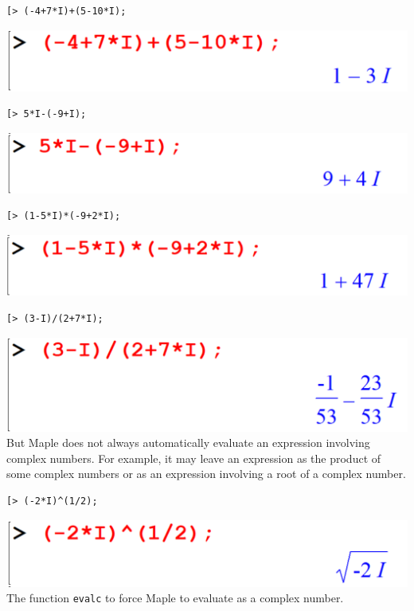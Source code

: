 \documentclass[
]{book}
\theoremstyle{definition}
\theoremstyle{definition}
\theoremstyle{definition}
\theoremstyle{definition}
\theoremstyle{remark}
\begin{document}
\begin{verbatim}
[> (-4+7*I)+(5-10*I);
\end{verbatim}

\includegraphics{figures/Lesson 1/fig42.png}

\begin{verbatim}
[> 5*I-(-9+I);
\end{verbatim}

\includegraphics{figures/Lesson 1/fig43.png}

\begin{verbatim}
[> (1-5*I)*(-9+2*I);
\end{verbatim}

\includegraphics{figures/Lesson 1/fig44.png}

\begin{verbatim}
[> (3-I)/(2+7*I);
\end{verbatim}

\includegraphics{figures/Lesson 1/fig45.png}
But Maple does not always automatically evaluate an expression involving complex numbers.
For example, it may leave an expression as the product of some complex numbers or as an expression involving a root of a complex number.

\begin{verbatim}
[> (-2*I)^(1/2);
\end{verbatim}

\includegraphics{figures/Lesson 1/fig46.png}
The function \texttt{evalc} to force Maple to evaluate as a complex number.
\end{document}
